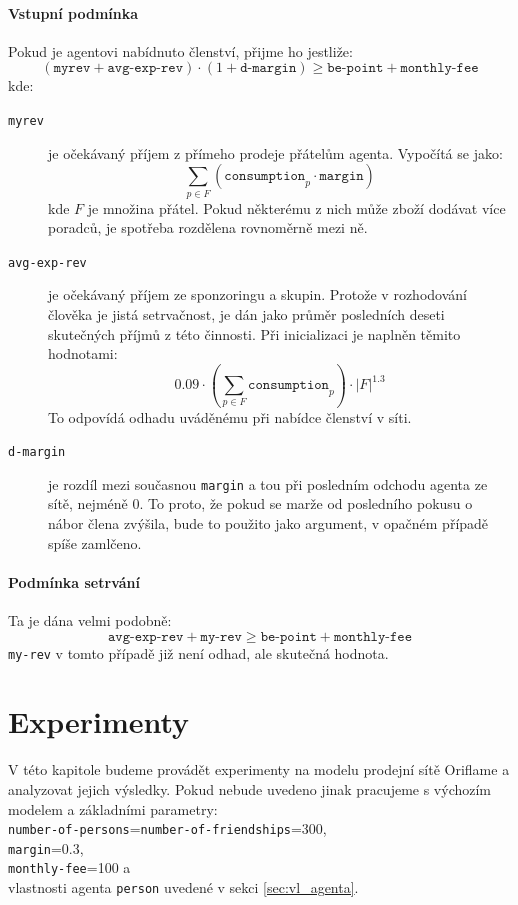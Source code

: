 \documentclass[a4wide,12pt]{report}
\begin{document}
\subsubsection{Vstupní podmínka}
Pokud je agentovi nabídnuto členství, přijme ho jestliže:
$$(\texttt{myrev} + \texttt{avg-exp-rev}) \cdot (1+\texttt{d-margin}) \geq \texttt{be-point} + \texttt{monthly-fee}$$
kde:
\begin{description}
\item[\texttt{myrev}] je očekávaný příjem z přímeho prodeje přátelům agenta. Vypočítá se jako: $$\sum_{p\in F}(\texttt{consumption}_p\cdot\texttt{margin})$$
kde $F$ je množina přátel. Pokud některému z nich může zboží dodávat více poradců, je spotřeba rozdělena rovnoměrně mezi ně.
\item[\texttt{avg-exp-rev}] je očekávaný příjem ze sponzoringu a skupin. Protože v rozhodování člověka je jistá setrvačnost, je dán jako průměr posledních deseti skutečných příjmů z této činnosti. Při inicializaci je naplněn těmito hodnotami:
\[ 0.09\cdot (\sum_{p\in F}\texttt{consumption}_p)\cdot |F|^{1.3} \]
To odpovídá odhadu uváděnému při nabídce členství v síti.
\item[\texttt{d-margin}] je rozdíl mezi současnou \texttt{margin} a tou při posledním odchodu agenta ze sítě, nejméně 0. To proto, že pokud se marže od posledního pokusu o nábor člena zvýšila, bude to použito jako argument, v opačném případě spíše zamlčeno.
\end{description}
\subsubsection{Podmínka setrvání}
Ta je dána velmi podobně:
\[ \texttt{avg-exp-rev} + \texttt{my-rev} \geq \texttt{be-point} + \texttt{monthly-fee} \]
\texttt{my-rev} v tomto případě již není odhad, ale skutečná hodnota.
\chapter{Experimenty}
V této kapitole budeme provádět experimenty na modelu prodejní sítě Oriflame a analyzovat jejich výsledky. Pokud nebude uvedeno jinak pracujeme s výchozím modelem a základními parametry:\\\texttt{number-of-persons}=\texttt{number-of-friendships}=300, \\\texttt{margin}=0.3,\\\texttt{monthly-fee}=100 a\\vlastnosti agenta \texttt{person} uvedené v sekci \ref{sec:vl_agenta}.
\end{document}

